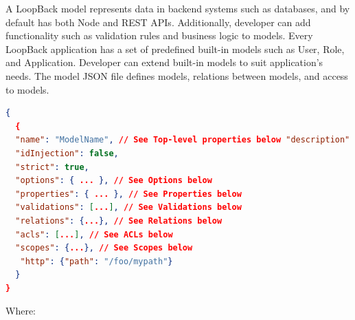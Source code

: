 A LoopBack model represents data in backend systems such as databases, and by default has both Node and REST APIs. Additionally, developer can add functionality such as validation rules and business logic to models. Every LoopBack application has a set of predefined built-in models such as User, Role, and Application. Developer can extend built-in models to suit application’s needs.
\newline
The model JSON file defines models, relations between models, and access to models.
\begin{lstlisting}[language=json]
{
  {
  "name": "ModelName", // See Top-level properties below "description": "A Customer model representing our customers.", "base": "User",
  "idInjection": false,
  "strict": true,
  "options": { ... }, // See Options below
  "properties": { ... }, // See Properties below
  "validations": [...], // See Validations below
  "relations": {...}, // See Relations below
  "acls": [...], // See ACLs below
  "scopes": {...}, // See Scopes below
   "http": {"path": "/foo/mypath"}
  }
}
\end{lstlisting}
Where:
